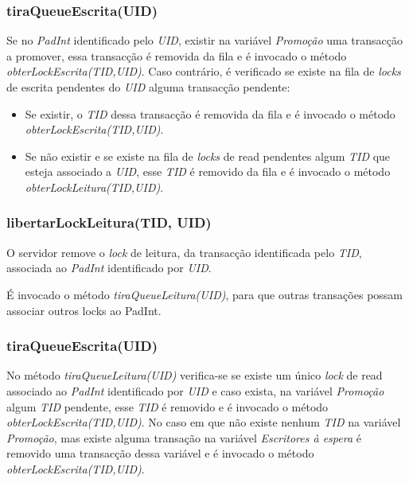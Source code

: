 \subsubsection{tiraQueueEscrita(UID)}

Se no \textit{PadInt} identificado pelo \textit{UID}, existir na variável \textit{Promoção} uma transacção a promover, essa transacção é removida da fila e é invocado o método \textit{obterLockEscrita(TID,UID)}. Caso contrário, é verificado se existe na fila de \textit{locks} de escrita pendentes do \textit{UID} alguma transacção pendente:
\begin{itemize}
	\item Se existir, o \textit{TID} dessa transacção é removida da fila e é invocado o método \textit{obterLockEscrita(TID,UID)}. 
	\item Se não existir e se existe na fila de \textit{locks} de read pendentes algum \textit{TID}  que esteja associado a \textit{UID}, esse \textit{TID} é removido da fila e é invocado o método \textit{obterLockLeitura(TID,UID)}.
\end{itemize}

\subsubsection{libertarLockLeitura(TID, UID)}

O servidor remove o \textit{lock} de leitura, da transacção identificada pelo \textit{TID}, associada ao \textit{PadInt} identificado por \textit{UID}.

É invocado o método \textit{tiraQueueLeitura(UID)}, para que outras transações possam associar outros locks ao PadInt.

\subsubsection{tiraQueueEscrita(UID)}

No método \textit{tiraQueueLeitura(UID)} verifica-se se existe um único \textit{lock} de read associado ao \textit{PadInt} identificado por \textit{UID} e caso exista, na variável \textit{Promoção} algum \textit{TID} pendente, esse \textit{TID} é removido e é invocado o método \textit{obterLockEscrita(TID,UID)}. No caso em que não existe nenhum \textit{TID} na variável \textit{Promoção}, mas existe alguma transação na variável \textit{Escritores à espera} é removido uma transacção dessa variável e é invocado o método \textit{obterLockEscrita(TID,UID)}.

